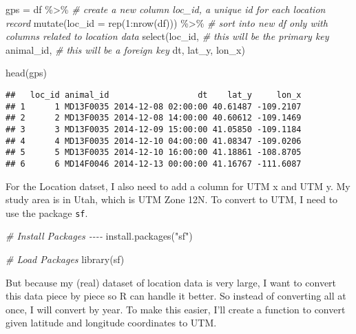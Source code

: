 \documentclass[
]{book}
\newenvironment{Shaded}{\begin{snugshade}}{\end{snugshade}}
\newcommand{\AttributeTok}[1]{\textcolor[rgb]{0.77,0.63,0.00}{#1}}
\newcommand{\CommentTok}[1]{\textcolor[rgb]{0.56,0.35,0.01}{\textit{#1}}}
\newcommand{\DecValTok}[1]{\textcolor[rgb]{0.00,0.00,0.81}{#1}}
\newcommand{\FunctionTok}[1]{\textcolor[rgb]{0.00,0.00,0.00}{#1}}
\newcommand{\NormalTok}[1]{#1}
\newcommand{\OtherTok}[1]{\textcolor[rgb]{0.56,0.35,0.01}{#1}}
\newcommand{\SpecialCharTok}[1]{\textcolor[rgb]{0.00,0.00,0.00}{#1}}
\newcommand{\StringTok}[1]{\textcolor[rgb]{0.31,0.60,0.02}{#1}}
\begin{document}
\begin{Shaded}
\begin{Highlighting}[]
\NormalTok{gps }\OtherTok{=}\NormalTok{  df }\SpecialCharTok{\%\textgreater{}\%}
  \CommentTok{\# create a new column loc\_id, a unique id for each location record}
  \FunctionTok{mutate}\NormalTok{(}\AttributeTok{loc\_id =} \FunctionTok{rep}\NormalTok{(}\DecValTok{1}\SpecialCharTok{:}\FunctionTok{nrow}\NormalTok{(df))) }\SpecialCharTok{\%\textgreater{}\%}
  \CommentTok{\# sort into new df only with columns related to location data}
  \FunctionTok{select}\NormalTok{(loc\_id, }\CommentTok{\# this will be the primary key}
\NormalTok{         animal\_id, }\CommentTok{\# this will be a foreign key}
\NormalTok{         dt,}
\NormalTok{         lat\_y,}
\NormalTok{         lon\_x)}

\FunctionTok{head}\NormalTok{(gps)}
\end{Highlighting}
\end{Shaded}

\begin{verbatim}
##   loc_id animal_id                  dt    lat_y     lon_x
## 1      1 MD13F0035 2014-12-08 02:00:00 40.61487 -109.2107
## 2      2 MD13F0035 2014-12-08 14:00:00 40.60612 -109.1469
## 3      3 MD13F0035 2014-12-09 15:00:00 41.05850 -109.1184
## 4      4 MD13F0035 2014-12-10 04:00:00 41.08347 -109.0206
## 5      5 MD13F0035 2014-12-10 16:00:00 41.18861 -108.8705
## 6      6 MD14F0046 2014-12-13 00:00:00 41.16767 -111.6087
\end{verbatim}

For the Location datset, I also need to add a column for UTM x and UTM y. My study area is in Utah, which is UTM Zone 12N. To convert to UTM, I need to use the package \texttt{sf}.

\begin{Shaded}
\begin{Highlighting}[]
\CommentTok{\# Install Packages {-}{-}{-}{-}}
\FunctionTok{install.packages}\NormalTok{(}\StringTok{"sf"}\NormalTok{)}
\end{Highlighting}
\end{Shaded}

\begin{Shaded}
\begin{Highlighting}[]
\CommentTok{\# Load Packages}
\FunctionTok{library}\NormalTok{(sf)}
\end{Highlighting}
\end{Shaded}

But because my (real) dataset of location data is very large, I want to convert this data piece by piece so R can handle it better. So instead of converting all at once, I will convert by year. To make this easier, I'll create a function to convert given latitude and longitude coordinates to UTM.
\end{document}

